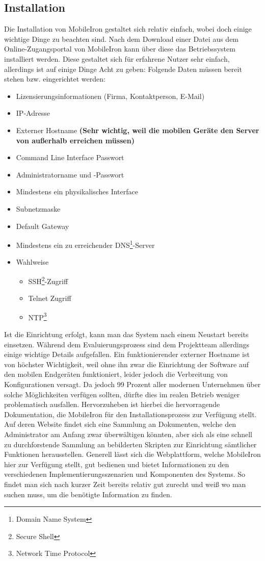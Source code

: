 \subsection{Installation}
Die Installation von MobileIron gestaltet sich relativ einfach, wobei doch einige wichtige Dinge zu beachten sind. Nach dem Download einer Datei aus dem Online-Zugangsportal von MobileIron kann über diese das Betriebssystem installiert werden. Diese gestaltet sich für erfahrene Nutzer sehr einfach, allerdings ist auf einige Dinge Acht zu geben: \newline
Folgende Daten müssen bereit stehen bzw. eingerichtet werden:
\begin{itemize}
	\item Lizensierungsinformationen (Firma, Kontaktperson, E-Mail)
	\item IP-Adresse
	\item Externer Hostname \textbf{(Sehr wichtig, weil die mobilen Geräte den Server von außerhalb erreichen müssen)}
	\item Command Line Interface Passwort
	\item Administratorname und -Passwort
	\item Mindestens ein physikalisches Interface
	\item Subnetzmaske
	\item Default Gateway
	\item Mindestens ein zu erreichender DNS\footnote{Domain Name System}-Server
	\item Wahlweise
	\begin{itemize}
		\item SSH\footnote{Secure Shell}-Zugriff
		\item Telnet Zugriff
		\item NTP\footnote{Network Time Protocol}
	\end{itemize}
\end{itemize}
Ist die Einrichtung erfolgt, kann man das System nach einem Neustart bereits einsetzen. Während dem Evaluierungsprozess sind dem Projektteam allerdings einige wichtige Details aufgefallen. Ein funktionierender externer Hostname ist von höchster Wichtigkeit, weil ohne ihn zwar die Einrichtung der Software auf den mobilen Endgeräten funktioniert, leider jedoch die Verbreitung von Konfigurationen versagt. Da jedoch 99 Prozent aller modernen Unternehmen über solche Möglichkeiten verfügen sollten, dürfte dies im realen Betrieb weniger problematisch ausfallen. Hervorzuheben ist hierbei die hervorragende Dokumentation, die MobileIron für den Installationsprozess zur Verfügung stellt. Auf deren Website findet sich eine Sammlung an Dokumenten, welche den Administrator am Anfang zwar überwältigen könnten, aber sich als eine schnell zu durchforstende Sammlung an bebilderten Skripten zur Einrichtung sämtlicher Funktionen herausstellen. Generell lässt sich die Webplattform, welche MobileIron hier zur Verfügung stellt, gut bedienen und bietet Informationen zu den verschiedenen Implementierungsszenarien und Komponenten des Systems. So findet man sich nach kurzer Zeit bereits relativ gut zurecht und weiß wo man suchen muss, um die benötigte Information zu finden.

